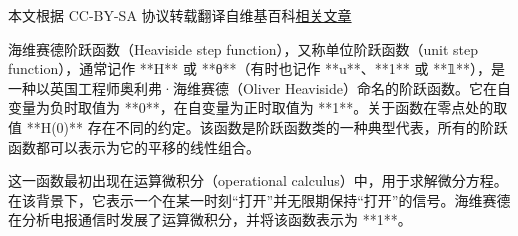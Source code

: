 
本文根据 CC-BY-SA 协议转载翻译自维基百科\href{https://en.wikipedia.org/wiki/Heaviside_step_function}{相关文章}

海维赛德阶跃函数（Heaviside step function），又称单位阶跃函数（unit step function），通常记作 **H** 或 **θ**（有时也记作 **u**、**1** 或 **𝟙**），是一种以英国工程师奥利弗·海维赛德（Oliver Heaviside）命名的阶跃函数。它在自变量为负时取值为 **0**，在自变量为正时取值为 **1**。关于函数在零点处的取值 **H(0)** 存在不同的约定。该函数是阶跃函数类的一种典型代表，所有的阶跃函数都可以表示为它的平移的线性组合。

这一函数最初出现在运算微积分（operational calculus）中，用于求解微分方程。在该背景下，它表示一个在某一时刻“打开”并无限期保持“打开”的信号。海维赛德在分析电报通信时发展了运算微积分，并将该函数表示为 **1**。
